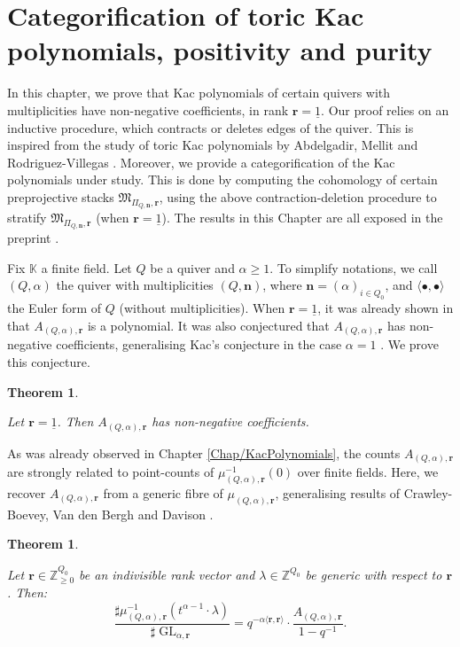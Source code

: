 \documentclass[11pt,english]{article}
\numberwithin{equation}{section}
\numberwithin{figure}{section}
\theoremstyle{definition}
\theoremstyle{plain}
\newtheorem{thm}[df]{Theorem}
\theoremstyle{remark}
\DeclareMathOperator{\GL}{GL}
\newcommand\nn{\mathbf{n}}
\newcommand\rr{\mathbf{r}}
\newcommand\ZZ{\mathbb{Z}}
\newcommand\KK{\mathbb{K}}
\begin{document}
\pagebreak{}

\section{Categorification of toric Kac polynomials, positivity and purity
\label{Chap/Categorification}}

In this chapter, we prove that Kac polynomials of certain quivers
with multiplicities have non-negative coefficients, in rank $\rr=\underline{1}$.
Our proof relies on an inductive procedure, which contracts or deletes
edges of the quiver. This is inspired from the study of toric Kac
polynomials by Abdelgadir, Mellit and Rodriguez-Villegas \cite{AMRV22}.
Moreover, we provide a categorification of the Kac polynomials under
study. This is done by computing the cohomology of certain preprojective
stacks $\mathfrak{M}_{\Pi_{Q,\nn},\rr}$, using the above contraction-deletion
procedure to stratify $\mathfrak{M}_{\Pi_{Q,\nn},\rr}$ (when $\rr=\underline{1}$).
The results in this Chapter are all exposed in the preprint \cite{Ver23}.

Fix $\KK$ a finite field. Let $Q$ be a quiver and $\alpha\geq1$.
To simplify notations, we call $(Q,\alpha)$ the quiver with multiplicities
$(Q,\nn)$, where $\nn=(\alpha)_{i\in Q_{0}}$, and $\langle\bullet,\bullet\rangle$
the Euler form of $Q$ (without multiplicities). When $\rr=\underline{1}$,
it was already shown in \cite{Wys17b,HLRV24} that $A_{(Q,\alpha),\rr}$
is a polynomial. It was also conjectured that $A_{(Q,\alpha),\rr}$
has non-negative coefficients, generalising Kac's conjecture in the
case $\alpha=1$ \cite[Rmk. 7.7.i.]{HLRV24}. We prove this conjecture.

\begin{thm} \label{Thm/Ch4PosToricKacPol}

Let $\rr=\underline{1}$. Then $A_{(Q,\alpha),\rr}$ has non-negative
coefficients.

\end{thm}

As was already observed in Chapter \ref{Chap/KacPolynomials}, the
counts $A_{(Q,\alpha),\rr}$ are strongly related to point-counts
of $\mu_{(Q,\alpha),\rr}^{-1}(0)$ over finite fields. Here, we recover
$A_{(Q,\alpha),\rr}$ from a generic fibre of $\mu_{(Q,\alpha),\rr}$,
generalising results of Crawley-Boevey, Van den Bergh \cite{CBVB04}
and Davison \cite{Dav23a}.

\begin{thm} \label{Thm/Ch4CountDefMomMapFibre}

Let $\rr\in\ZZ_{\geq0}^{Q_{0}}$ be an indivisible rank vector and
$\lambda\in\ZZ^{Q_{0}}$ be generic with respect to $\rr$. Then:
\[
\frac{\sharp\mu_{(Q,\alpha),\rr}^{-1}(t^{\alpha-1}\cdot\lambda)}{\sharp\GL_{\alpha,\rr}}=q^{-\alpha\langle\rr,\rr\rangle}\cdot\frac{A_{(Q,\alpha),\rr}}{1-q^{-1}}.
\]

\end{thm}
\end{document}
